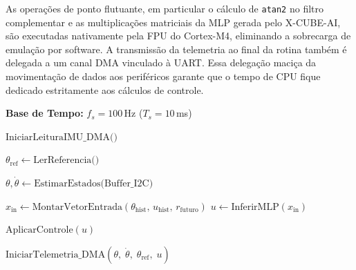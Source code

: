 As operações de ponto flutuante, em particular o cálculo de \texttt{atan2} no filtro complementar e as multiplicações matriciais da MLP gerada pelo X-CUBE-AI, são executadas nativamente pela FPU do Cortex-M4, eliminando a sobrecarga de emulação por software. A transmissão da telemetria ao final da rotina também é delegada a um canal DMA vinculado à UART. Essa delegação maciça da movimentação de dados aos periféricos garante que o tempo de CPU fique dedicado estritamente aos cálculos de controle.

\begin{algorithm}[H]
\caption{Rotina de Controle em Tempo Real (Arquitetura DMA)}
\label{alg:isr_controle}
\begin{algorithmic}[1]
\Statex \textbf{Base de Tempo:} $f_s = 100$\,Hz ($T_s = 10$\,ms)
\Statex

    \State {}
    \State $\text{IniciarLeituraIMU\_DMA()}$ 
\EndProcedure

\Statex
{}
    \State {}
    \State $\theta_{\text{ref}} \gets \text{LerReferencia()}$

    \Statex
    \State {}
    \State $\theta, \dot{\theta} \gets \text{EstimarEstados(Buffer\_I2C)}$

    \Statex
    \State {}
    \State $x_{\text{in}} \gets \text{MontarVetorEntrada}(\theta_{\text{hist}},\, u_{\text{hist}},\, r_{\text{futuro}})$ 
    \State $u \gets \text{InferirMLP}(x_{\text{in}})$

    \Statex
    \State {}
    \State $\text{AplicarControle}(u)$

    \Statex
    \State {}
    \State $\text{IniciarTelemetria\_DMA}(\theta,\; \dot{\theta},\; \theta_{\text{ref}},\; u)$
\EndProcedure
\end{algorithmic}
\end{algorithm}
